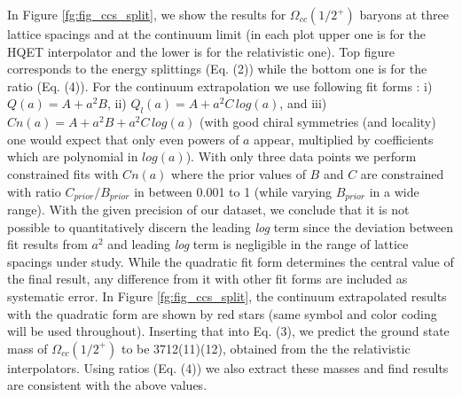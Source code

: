 \documentclass[showkeys,aps,twocolumn,showpacs,preprintnumbers,amsmath,amssymb,prl,letterpaper,floatfix,nofootinbib,superscriptaddress,]{revtex4-1}
\newcommand\fgn[1]{Figure \ref{fg:#1}}
\begin{document}
{{%
%
 In \fgn{fig_ccs_split}, we show the results for $\Omega_{cc} (1/2^{+})$ baryons at three
lattice spacings and at the continuum limit (in each plot upper one is for the HQET interpolator and the lower is for the relativistic one).
Top figure corresponds to
the energy splittings (Eq. (2)) while the bottom
one is for the ratio (Eq. (4)). For the continuum extrapolation we use following fit forms : i) $Q(a) = A + a^2B$, ii) $Q_l(a) = A + a^2C\,log(a)$, and iii)  $Cn(a) = A + a^2B+ a^2C\,log(a)$ (with good chiral symmetries (and locality) one would expect that only even powers of $a$ appear, multiplied by coefficients which are polynomial in $log(a)$). With only three data points we perform constrained fits \cite{Lepage:2001ym,Chen:2004gp,McNeile:2012qf} with $Cn(a)$ where the prior values of $B$ and $C$ are constrained with ratio $C_{prior}/B_{prior}$ in between 0.001 to 1 (while varying $B_{prior}$ in a wide range). With the given precision of our dataset, we conclude that it is not possible to quantitatively discern the leading {\it log} term since the deviation between fit results from $a^2$ and leading {\it log} term is negligible in the range of lattice spacings under study. While the quadratic fit form determines the central value of the final result, any difference from it with other fit forms are included as systematic error. In \fgn{fig_ccs_split}, the continuum extrapolated results with the quadratic form are shown by red stars (same symbol and color coding will be used throughout).
Inserting that into Eq. (3), we predict the ground state mass of $\Omega_{cc} (1/2^{+})$ to be 3712(11)(12), obtained from the the relativistic interpolators.
Using ratios (Eq. (4)) we also extract these masses and find results are consistent with the above values.


}}
\end{document}
